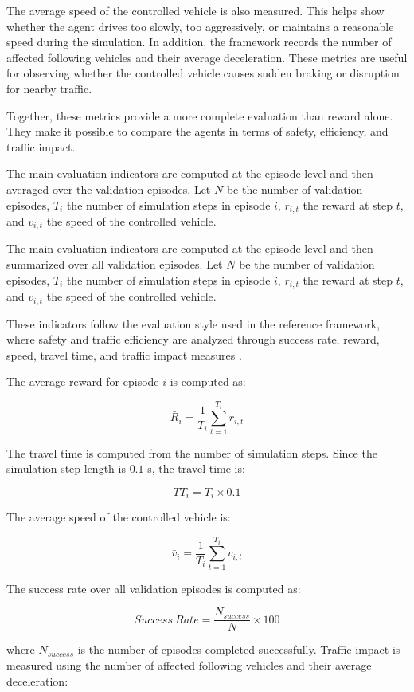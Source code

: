 \documentclass{article}
\begin{document}
The average speed of the controlled vehicle is also measured. This helps show whether the agent drives too slowly, too aggressively, or maintains a reasonable speed during the simulation. In addition, the framework records the number of affected following vehicles and their average deceleration. These metrics are useful for observing whether the controlled vehicle causes sudden braking or disruption for nearby traffic.

Together, these metrics provide a more complete evaluation than reward alone. They make it possible to compare the agents in terms of safety, efficiency, and traffic impact.


The main evaluation indicators are computed at the episode level and then averaged over the validation episodes. Let $N$ be the number of validation episodes, $T_i$ the number of simulation steps in episode $i$, $r_{i,t}$ the reward at step $t$, and $v_{i,t}$ the speed of the controlled vehicle.

The main evaluation indicators are computed at the episode level and then summarized over all validation episodes. Let $N$ be the number of validation episodes, $T_i$ the number of simulation steps in episode $i$, $r_{i,t}$ the reward at step $t$, and $v_{i,t}$ the speed of the controlled vehicle.


\noindent
These indicators follow the evaluation style used in the reference framework, where safety and traffic efficiency are analyzed through success rate, reward, speed, travel time, and traffic impact measures \cite{maad2025dynamic}.

The average reward for episode $i$ is computed as:

\[
\bar{R}_i = \frac{1}{T_i}\sum_{t=1}^{T_i} r_{i,t}
\]

The travel time is computed from the number of simulation steps. Since the simulation step length is $0.1$ s, the travel time is:

\[
TT_i = T_i \times 0.1
\]

The average speed of the controlled vehicle is:

\[
\bar{v}_i = \frac{1}{T_i}\sum_{t=1}^{T_i} v_{i,t}
\]

The success rate over all validation episodes is computed as:

\[
Success\ Rate = \frac{N_{success}}{N} \times 100
\]

where $N_{success}$ is the number of episodes completed successfully. Traffic impact is measured using the number of affected following vehicles and their average deceleration:
\end{document}
